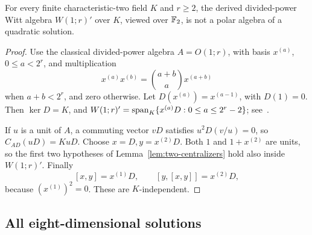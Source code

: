 \begin{proposition}\label{prop:Witt-obstruction}
For every finite characteristic-two field \(K\) and \(r\ge2\), the
derived divided-power Witt algebra \(W(1;r)'\) over \(K\), viewed over
\(\mathbb F_2\), is not a polar algebra of a quadratic solution.
\end{proposition}
\begin{proof}
Use the classical divided-power algebra \(A=O(1;r)\), with basis
\(x^{(a)}\), \(0\le a<2^r\), and multiplication
\[
 x^{(a)}x^{(b)}=\binom{a+b}{a}x^{(a+b)}
\]
when \(a+b<2^r\), and zero otherwise. Let
\(D(x^{(a)})=x^{(a-1)}\), with \(D(1)=0\).
Then \(\ker D=K\), and
\(W(1;r)'=\operatorname{span}_K\{x^{(a)}D:0\le a\le2^r-2\}\);
see~\cite[Section~4.5]{LopatkinZusmanovich2019}.

If \(u\) is a unit of \(A\), a commuting vector \(vD\) satisfies
\(u^2D(v/u)=0\), so \(C_{AD}(uD)=KuD\).
Choose \(x=D,y=x^{(2)}D\). Both \(1\) and \(1+x^{(2)}\) are units,
so the first two hypotheses of Lemma~\ref{lem:two-centralizers} hold
also inside \(W(1;r)'\). Finally
\[
 [x,y]=x^{(1)}D,\qquad [y,[x,y]]=x^{(2)}D,
\]
because \((x^{(1)})^2=0\). These are \(K\)-independent.
\end{proof}

\subsection{All eight-dimensional solutions}

